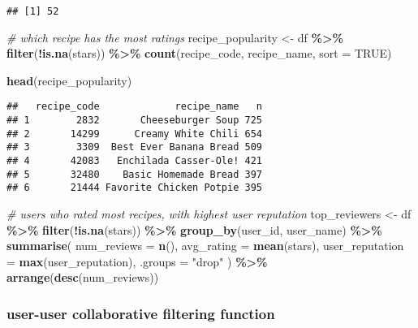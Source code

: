 \documentclass[
]{article}
\newenvironment{Shaded}{\begin{snugshade}}{\end{snugshade}}
\newcommand{\AttributeTok}[1]{\textcolor[rgb]{0.13,0.29,0.53}{#1}}
\newcommand{\CommentTok}[1]{\textcolor[rgb]{0.56,0.35,0.01}{\textit{#1}}}
\newcommand{\ConstantTok}[1]{\textcolor[rgb]{0.56,0.35,0.01}{#1}}
\newcommand{\FunctionTok}[1]{\textcolor[rgb]{0.13,0.29,0.53}{\textbf{#1}}}
\newcommand{\NormalTok}[1]{#1}
\newcommand{\OtherTok}[1]{\textcolor[rgb]{0.56,0.35,0.01}{#1}}
\newcommand{\SpecialCharTok}[1]{\textcolor[rgb]{0.81,0.36,0.00}{\textbf{#1}}}
\newcommand{\StringTok}[1]{\textcolor[rgb]{0.31,0.60,0.02}{#1}}
\begin{document}
\begin{verbatim}
## [1] 52
\end{verbatim}

\begin{Shaded}
\begin{Highlighting}[]
\CommentTok{\# which recipe has the most ratings}
\NormalTok{recipe\_popularity }\OtherTok{\textless{}{-}}\NormalTok{ df }\SpecialCharTok{\%\textgreater{}\%}
  \FunctionTok{filter}\NormalTok{(}\SpecialCharTok{!}\FunctionTok{is.na}\NormalTok{(stars)) }\SpecialCharTok{\%\textgreater{}\%}
  \FunctionTok{count}\NormalTok{(recipe\_code, recipe\_name, }\AttributeTok{sort =} \ConstantTok{TRUE}\NormalTok{)}

\FunctionTok{head}\NormalTok{(recipe\_popularity)}
\end{Highlighting}
\end{Shaded}

\begin{verbatim}
##   recipe_code             recipe_name   n
## 1        2832       Cheeseburger Soup 725
## 2       14299      Creamy White Chili 654
## 3        3309  Best Ever Banana Bread 509
## 4       42083   Enchilada Casser-Ole! 421
## 5       32480    Basic Homemade Bread 397
## 6       21444 Favorite Chicken Potpie 395
\end{verbatim}

\begin{Shaded}
\begin{Highlighting}[]
\CommentTok{\# users who rated most recipes, with highest user reputation}
\NormalTok{top\_reviewers }\OtherTok{\textless{}{-}}\NormalTok{ df }\SpecialCharTok{\%\textgreater{}\%}
  \FunctionTok{filter}\NormalTok{(}\SpecialCharTok{!}\FunctionTok{is.na}\NormalTok{(stars)) }\SpecialCharTok{\%\textgreater{}\%}
  \FunctionTok{group\_by}\NormalTok{(user\_id, user\_name) }\SpecialCharTok{\%\textgreater{}\%}
  \FunctionTok{summarise}\NormalTok{(}
    \AttributeTok{num\_reviews =} \FunctionTok{n}\NormalTok{(),}
    \AttributeTok{avg\_rating =} \FunctionTok{mean}\NormalTok{(stars),}
    \AttributeTok{user\_reputation =} \FunctionTok{max}\NormalTok{(user\_reputation),}
    \AttributeTok{.groups =} \StringTok{"drop"} 
\NormalTok{  ) }\SpecialCharTok{\%\textgreater{}\%}
  \FunctionTok{arrange}\NormalTok{(}\FunctionTok{desc}\NormalTok{(num\_reviews))}
\end{Highlighting}
\end{Shaded}

\subsubsection{user-user collaborative filtering
function}\label{user-user-collaborative-filtering-function}
\end{document}
